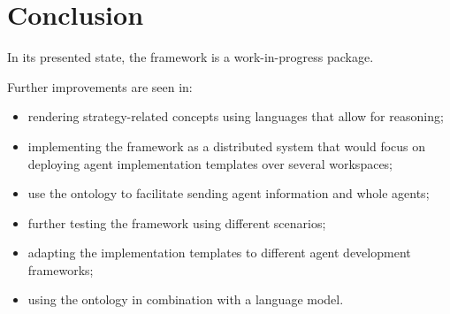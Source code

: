 \section{Conclusion}

\begin{frame}{\insertsection}
    In its presented state, the framework is a \alert{work-in-progress} package.

    Further improvements are seen in:
    \begin{itemize}
        \item rendering strategy-related concepts using languages that allow for reasoning;
        \item implementing the framework as a distributed system that would focus on deploying agent implementation templates over several workspaces;
        \item use the \magoag ontology to facilitate sending agent information and whole agents;
        \item further testing the framework using different scenarios;
        \item adapting the implementation templates to different agent development frameworks;
        \item using the \magoag ontology in combination with a language model.
    \end{itemize}
\end{frame}